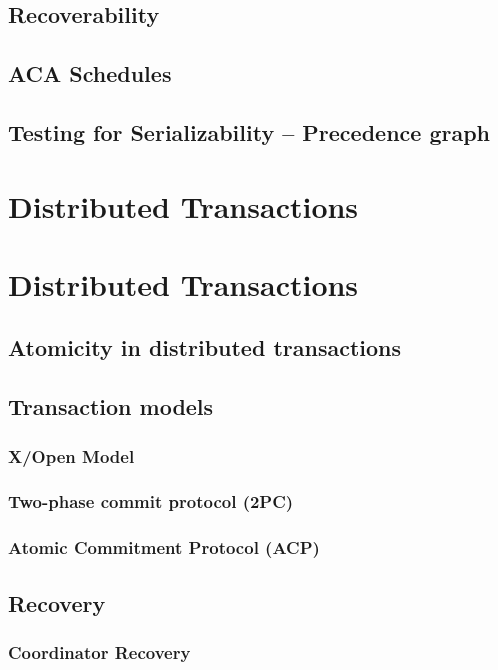 		\subsection{Recoverability}
		
		\subsection{ACA Schedules}
		
		\subsection{Testing for Serializability -- Precedence graph}
		
		\section{Distributed Transactions}
		
		
	\section{Distributed Transactions}
	
		\subsection{Atomicity in distributed transactions}
		
		\subsection{Transaction models}
			\subsubsection{X/Open Model}
			
			\subsubsection{Two-phase commit protocol (2PC)}
			
			\subsubsection{Atomic Commitment Protocol (ACP)}
			
			
		\subsection{Recovery}
			\subsubsection{Coordinator Recovery}
			
